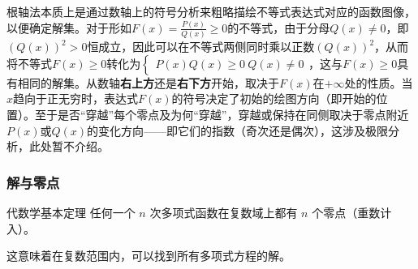 根轴法本质上是通过数轴上的符号分析来粗略描绘不等式表达式对应的函数图像，以便确定解集。对于形如$\displaystyle F(x) = \frac{P(x)}{Q(x)} \geq 0$的不等式，由于分母$Q(x) \neq 0$，即$\left(Q(x)\right)^2 > 0$恒成立，因此可以在不等式两侧同时乘以正数$\left(Q(x)\right)^2$，从而将不等式$\displaystyle F(x) \geq 0$转化为$\begin{cases}P(x)Q(x) \geq 0 \ Q(x) \neq 0\end{cases}$，这与$F(x) \geq 0$具有相同的解集。从数轴\textbf{右上方}还是\textbf{右下方}开始，取决于$F(x)$在$+\infty$处的性质。当$x$趋向于正无穷时，表达式$F(x)$的符号决定了初始的绘图方向（即开始的位置）。至于是否“穿越”每个零点及为何“穿越”，穿越或保持在同侧取决于零点附近$P(x)$或$Q(x)$的变化方向——即它们的指数（奇次还是偶次），这涉及极限分析，此处暂不介绍。

\subsubsection{解与零点}

\begin{definition}{代数学基本定理}
任何一个 $n$ 次多项式函数在复数域上都有 $n$ 个零点（重数计入）。
\end{definition}
这意味着在复数范围内，可以找到所有多项式方程的解。



